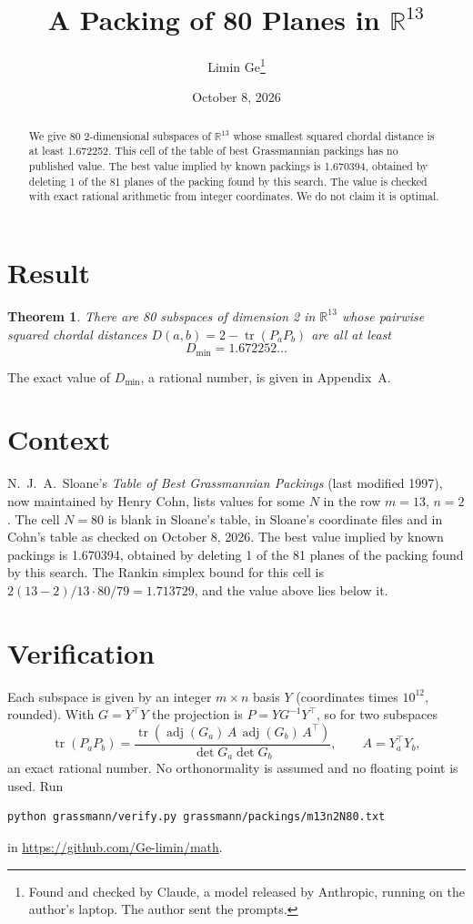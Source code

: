 \documentclass[11pt,a4paper]{article}
\title{A Packing of 80 Planes in $\mathbb{R}^{13}$}
\author{Limin Ge\thanks{Found and checked by Claude, a model released by Anthropic, running on the author's laptop. The author sent the prompts.}}
\date{October 8, 2026}
\newtheorem*{theorem}{Theorem}
\begin{document}
\maketitle
\begin{abstract}
We give 80 2-dimensional subspaces of $\mathbb{R}^{13}$ whose smallest squared chordal distance is at least 1.672252. This cell of the table of best Grassmannian packings has no published value. The best value implied by known packings is 1.670394, obtained by deleting 1 of the 81 planes of the packing found by this search. The value is checked with exact rational arithmetic from integer coordinates. We do not claim it is optimal.
\end{abstract}

\section{Result}
\begin{theorem}
There are 80 subspaces of dimension 2 in $\mathbb{R}^{13}$ whose pairwise squared chordal distances $D(a,b) = 2 - \operatorname{tr}(P_aP_b)$ are all at least
\[ D_{\min} = 1.672252\ldots \]
\end{theorem}
The exact value of $D_{\min}$, a rational number, is given in Appendix~A.


\section{Context}
N.~J.~A.~Sloane's \emph{Table of Best Grassmannian Packings} (last modified 1997), now maintained by Henry Cohn, lists values for some $N$ in the row $m=13$, $n=2$. The cell $N=80$ is blank in Sloane's table, in Sloane's coordinate files and in Cohn's table as checked on October 8, 2026. The best value implied by known packings is 1.670394, obtained by deleting 1 of the 81 planes of the packing found by this search. The Rankin simplex bound for this cell is $2(13-2)/13\cdot 80/79 = 1.713729$, and the value above lies below it.


\section{Verification}
Each subspace is given by an integer $m\times n$ basis $Y$ (coordinates times $10^{12}$, rounded). With $G=Y^\top Y$ the projection is $P=YG^{-1}Y^\top$, so for two subspaces
\[ \operatorname{tr}(P_aP_b)=\frac{\operatorname{tr}(\operatorname{adj}(G_a)\,A\,\operatorname{adj}(G_b)\,A^\top)}{\det G_a\det G_b},\qquad A=Y_a^\top Y_b, \]
an exact rational number. No orthonormality is assumed and no floating point is used. Run
\begin{verbatim}
python grassmann/verify.py grassmann/packings/m13n2N80.txt
\end{verbatim}
in \url{https://github.com/Ge-limin/math}.
\end{document}
